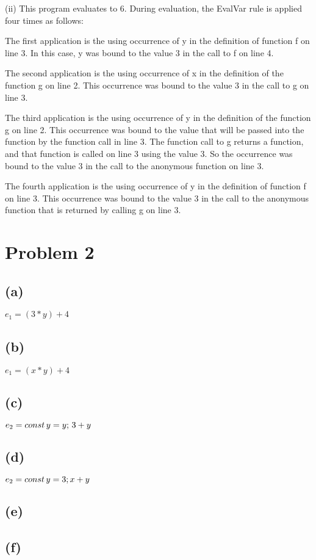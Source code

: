 \documentclass[11pt, oneside]{article}
\newcommand{\forceindent}{\leavevmode{\parindent=1.5em\indent}}
\begin{document}
\par (ii) This program evaluates to 6. During evaluation, the EvalVar rule is applied four times as follows:
\par The first application is the using occurrence of y in the definition of function f on line 3. In this case, y was bound to the value 3 in the call to f on line 4.
\par The second application is the using occurrence of x in the definition of the function g on line 2. This occurrence was bound to the value 3 in the call to g on line 3.
\par The third application is the using occurrence of y in the definition of the function g on line 2. This occurrence was bound to the value that will be passed into the function by the function call in line 3. The function call to g returns a function, and that function is called on line 3 using the value 3. So the occurrence was bound to the value 3 in the call to the anonymous function on line 3.
\par The fourth application is the using occurrence of y in the definition of function f on line 3. This occurrence was bound to the value 3 in the call to the anonymous function that is returned by calling g on line 3. 

\section{Problem 2}
\subsection*{(a)}
\forceindent \par $e_1 = (3 * y) + 4$

\subsection*{(b)}
\forceindent \par $e_1 = (x * y) + 4$

\subsection*{(c)}
\forceindent \par $e_2 = const \thinspace y = y; \thinspace 3 + y$

\subsection*{(d)}
\forceindent \par $e_2 = const \thinspace y = 3; x + y$

\subsection*{(e)}
\forceindent \par 

\subsection*{(f)}
\forceindent \par 
\end{document}
